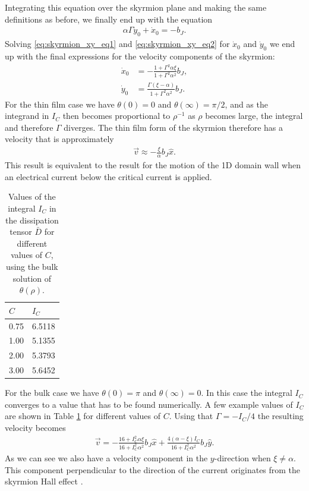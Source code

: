 \documentclass[1p]{elsarticle}		%
\numberwithin{equation}{section}
\begin{document}
Integrating this equation over the skyrmion plane and making the same definitions as before, we finally end up with the equation
\begin{align}
\label{eq:skyrmion_xy_eq2}
\alpha\Gamma\dot{y}_0 + \dot{x}_0 = -b_J.
\end{align}
Solving \eqref{eq:skyrmion_xy_eq1} and \eqref{eq:skyrmion_xy_eq2} for $\dot{x}_0$ and $\dot{y}_0$ we end up with the final expressions for the velocity components of the skyrmion:
\begin{align}
\dot{x}_0 &= -\frac{1+\Gamma^2\alpha\xi}{1+\Gamma^2\alpha^2}b_J, \label{eq:skyrmion_xdot} \\
\dot{y}_0 &= \frac{\Gamma(\xi-\alpha)}{1+\Gamma^2\alpha^2}b_J. \label{eq:skyrmion_ydot}
\end{align}
For the thin film case we have $\theta(0) = 0$ and $\theta(\infty)=\pi/2$, and as the integrand in $I_C$ then becomes proportional to $\rho^{-1}$ as $\rho$ becomes large, the integral and therefore $\Gamma$ diverges. The thin film form of the skyrmion therefore has a velocity that is approximately
\begin{align}
\vec{v} \approx -\frac{\xi}{\alpha}b_J\hat{x}.
\end{align}
This result is equivalent to the result for the motion of the 1D domain wall when an electrical current below the critical current is applied.\\
\begin{table}[h!]
	\centering
		\caption{Values of the integral $I_C$ in the dissipation tensor $\bar{D}$ for different values of $C$, using the bulk solution of $\theta(\rho)$.} 
	\begin{tabular}{l l} \hline
	$C$ & $I_C$\\ \hline
	0.75  & 6.5118\\
 	1.00  & 5.1355\\
 	2.00  & 5.3793 \\ 
 	3.00  & 5.6452 \\ \hline
	\end{tabular}
	\label{tab:C_I}
\end{table}
For the bulk case we have $\theta(0) = \pi$ and $\theta(\infty) = 0$. In this case the integral $I_C$ converges to a value that has to be found numerically. A few example values of $I_C$ are shown in Table \ref{tab:C_I} for different values of $C$. Using that $\Gamma = -I_C/4$ the resulting velocity becomes
\begin{align}
\vec{v} = -\frac{16+I_C^2\alpha\xi}{16+I_C^2\alpha^2}b_J\hat{x} + \frac{4(\alpha-\xi)I_C}{16+I_C^2\alpha^2}b_J\hat{y}.
\end{align}
As we can see we also have a velocity component in the $y$-direction when $\xi\neq\alpha$. This component perpendicular to the direction of the current originates from the skyrmion Hall effect \cite{Nagaosa2013}.
\end{document}
